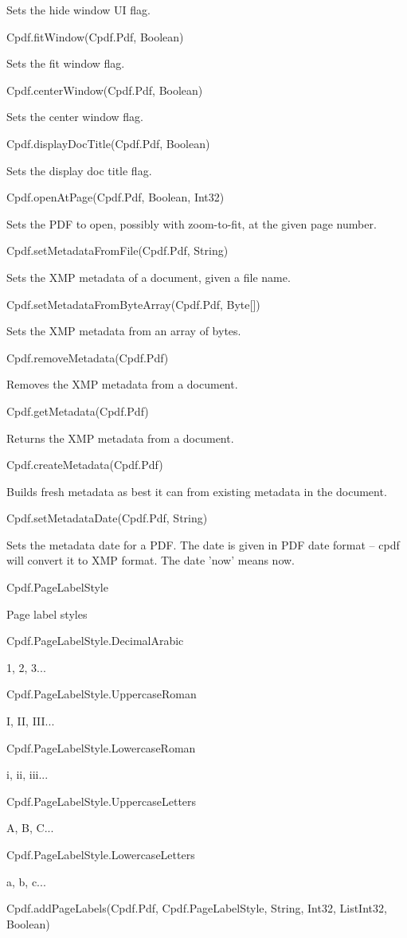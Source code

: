 Sets the hide window UI flag.

Cpdf.fitWindow(Cpdf.Pdf, Boolean)

Sets the fit window flag.

Cpdf.centerWindow(Cpdf.Pdf, Boolean)

Sets the center window flag.

Cpdf.displayDocTitle(Cpdf.Pdf, Boolean)

Sets the display doc title flag.

Cpdf.openAtPage(Cpdf.Pdf, Boolean, Int32)

Sets the PDF to open, possibly with zoom-to-fit, at the given page number.

Cpdf.setMetadataFromFile(Cpdf.Pdf, String)

Sets the XMP metadata of a document, given a file name.

Cpdf.setMetadataFromByteArray(Cpdf.Pdf, Byte[])

Sets the XMP metadata from an array of bytes.

Cpdf.removeMetadata(Cpdf.Pdf)

Removes the XMP metadata from a document.

Cpdf.getMetadata(Cpdf.Pdf)

Returns the XMP metadata from a document.

Cpdf.createMetadata(Cpdf.Pdf)

Builds fresh metadata as best it can from
existing metadata in the document.

Cpdf.setMetadataDate(Cpdf.Pdf, String)

Sets the metadata date for a PDF. The date is given in PDF date format -- cpdf
will convert it to XMP format. The date 'now' means now.

Cpdf.PageLabelStyle

Page label styles

Cpdf.PageLabelStyle.DecimalArabic

1, 2, 3...

Cpdf.PageLabelStyle.UppercaseRoman

I, II, III...

Cpdf.PageLabelStyle.LowercaseRoman

i, ii, iii...

Cpdf.PageLabelStyle.UppercaseLetters

A, B, C...

Cpdf.PageLabelStyle.LowercaseLetters

a, b, c...

Cpdf.addPageLabels(Cpdf.Pdf, Cpdf.PageLabelStyle, String, Int32, List{Int32},
Boolean)


